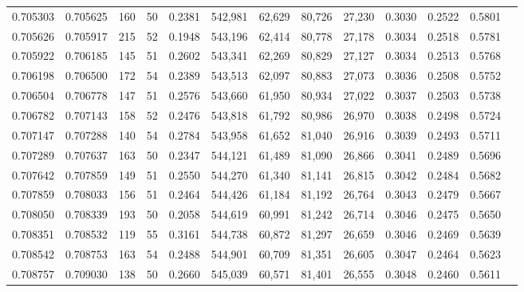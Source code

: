 \begin{tabular}{rrrrrrrrrrrrr}
0.705303 & 0.705625 &   160 &  50 &                                     0.2381 & 542,981 &  62,629 &  80,726 &  27,230 & 0.3030 & 0.2522 & 0.5801 \\
0.705626 & 0.705917 &   215 &  52 &                                     0.1948 & 543,196 &  62,414 &  80,778 &  27,178 & 0.3034 & 0.2518 & 0.5781 \\
0.705922 & 0.706185 &   145 &  51 &                                     0.2602 & 543,341 &  62,269 &  80,829 &  27,127 & 0.3034 & 0.2513 & 0.5768 \\
0.706198 & 0.706500 &   172 &  54 &                                     0.2389 & 543,513 &  62,097 &  80,883 &  27,073 & 0.3036 & 0.2508 & 0.5752 \\
0.706504 & 0.706778 &   147 &  51 &                                     0.2576 & 543,660 &  61,950 &  80,934 &  27,022 & 0.3037 & 0.2503 & 0.5738 \\
0.706782 & 0.707143 &   158 &  52 &                                     0.2476 & 543,818 &  61,792 &  80,986 &  26,970 & 0.3038 & 0.2498 & 0.5724 \\
0.707147 & 0.707288 &   140 &  54 &                                     0.2784 & 543,958 &  61,652 &  81,040 &  26,916 & 0.3039 & 0.2493 & 0.5711 \\
0.707289 & 0.707637 &   163 &  50 &                                     0.2347 & 544,121 &  61,489 &  81,090 &  26,866 & 0.3041 & 0.2489 & 0.5696 \\
0.707642 & 0.707859 &   149 &  51 &                                     0.2550 & 544,270 &  61,340 &  81,141 &  26,815 & 0.3042 & 0.2484 & 0.5682 \\
0.707859 & 0.708033 &   156 &  51 &                                     0.2464 & 544,426 &  61,184 &  81,192 &  26,764 & 0.3043 & 0.2479 & 0.5667 \\
0.708050 & 0.708339 &   193 &  50 &                                     0.2058 & 544,619 &  60,991 &  81,242 &  26,714 & 0.3046 & 0.2475 & 0.5650 \\
0.708351 & 0.708532 &   119 &  55 &                                     0.3161 & 544,738 &  60,872 &  81,297 &  26,659 & 0.3046 & 0.2469 & 0.5639 \\
0.708542 & 0.708753 &   163 &  54 &                                     0.2488 & 544,901 &  60,709 &  81,351 &  26,605 & 0.3047 & 0.2464 & 0.5623 \\
0.708757 & 0.709030 &   138 &  50 &                                     0.2660 & 545,039 &  60,571 &  81,401 &  26,555 & 0.3048 & 0.2460 & 0.5611 \\

\end{tabular}
